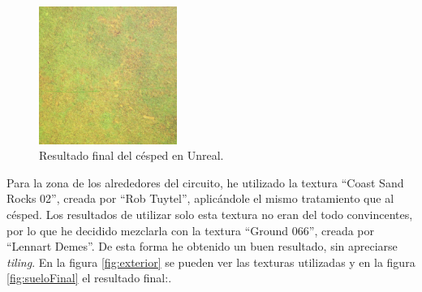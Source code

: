 \begin{figure}[H]
    \centering
    \includegraphics[width=0.4\textwidth]{imagenes/converted/cespedTextFinal}
    \caption{Resultado final del césped en Unreal.}
    \label{fig:grassfinal}
\end{figure}

Para la zona de los alrededores del circuito, he utilizado la textura ``Coast Sand Rocks 02''\cite{coastsand}, creada por ``Rob Tuytel'', aplicándole el mismo tratamiento que al césped. Los resultados de utilizar solo esta textura no eran del todo convincentes, por lo que he decidido mezclarla con la textura ``Ground 066''\cite{ground066}, creada por ``Lennart Demes''. De esta forma he obtenido un buen resultado, sin apreciarse \textit{tiling}. En la figura \ref{fig:exterior} se pueden ver las texturas utilizadas y en la figura \ref{fig:sueloFinal} el resultado final:.


